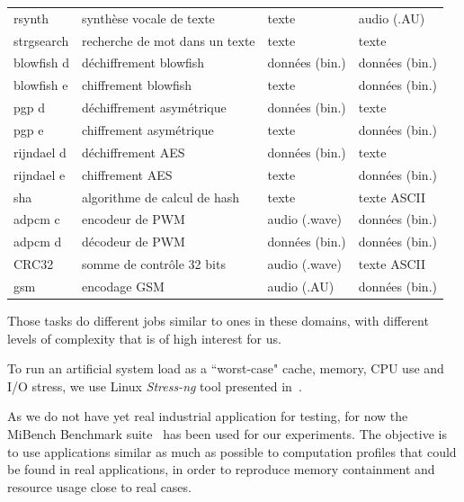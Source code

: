 \documentclass[french, a4paper, 11pt, twoside, pdftex]{StyleThese}
\begin{document}
\begin{table}[ht!]
\begin{tabular}{@{}llll@{}}
		rsynth       & synthèse vocale de texte             & texte              & audio (.AU)         \\
		strgsearch & recherche de mot dans un texte			& texte              & texte               \\
		blowfish d   & déchiffrement blowfish               & données (bin.)  	 & données (bin.)      \\
		blowfish e   & chiffrement blowfish                 & texte              & données (bin.)      \\
		pgp d        & déchiffrement asymétrique      		& données (bin.)  	 & texte               \\
		pgp e        & chiffrement asymétrique				& texte              & données (bin.)      \\
		rijndael d   & déchiffrement AES                    & données (bin.)  	 & texte               \\
		rijndael e   & chiffrement AES                      & texte              & données (bin.)      \\
		sha          & algorithme de calcul de hash			& texte              & texte ASCII         \\
		adpcm c      & encodeur de PWM                      & audio (.wave)      & données (bin.)      \\
		adpcm d      & décodeur de PWM                      & données (bin.)  	 & données (bin.)      \\
		CRC32        & somme de contrôle 32 bits     		& audio (.wave)      & texte ASCII         \\
		gsm          & encodage GSM                         & audio (.AU)        & données (bin.)      \\ 
		\bottomrule
	\end{tabular}
\end{table}
    
        Those tasks do different jobs similar to ones in these domains, with different levels of complexity that is of high interest for us.

            To run an artificial system load as a ``worst-case" cache, memory, CPU use and I/O stress, we use Linux \textit{Stress-ng} tool presented in~\cite{king_stress-ng_2019}. 


            As we do not have yet real industrial application for testing, for now the MiBench Benchmark suite~\cite{guthaus_mibench_2001} has been used for our experiments. The objective is to use applications similar as much as possible to computation profiles that could be found in real applications, in order to reproduce memory containment and resource usage close to real cases. 
            
\end{document}
